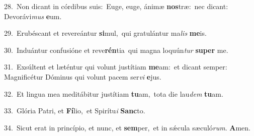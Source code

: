 {\numbfont\textcolor{\numbcolor}{28.}}~Non dicant in córdibus suis:~\dagger Euge, euge, ánimæ \textbf{nos}\-træ:~\star nec dicant: Devorávi\textit{mus} \textbf{e}\-um.\par
{\numbfont\textcolor{\numbcolor}{29.}}~Erubéscant et revereántur \textbf{si}\-mul,~\star qui gratulántur ma\textit{lis} \textbf{me}\-is.\par
{\numbfont\textcolor{\numbcolor}{30.}}~Induántur confusióne et reve\-\textbf{rén}\-tia~\star qui magna loquún\textit{tur} \textbf{su}\-\textbf{per} me.\par
{\numbfont\textcolor{\numbcolor}{31.}}~Exsúltent et læténtur qui volunt justítiam \textbf{me}\-am:~\star et dicant semper: Magnificétur Dóminus qui volunt pacem ser\textit{vi} \textbf{e}\-jus.\par
{\numbfont\textcolor{\numbcolor}{32.}}~Et lingua mea meditábitur justítiam \textbf{tu}\-am,~\star tota die lau\textit{dem} \textbf{tu}\-am.\par
{\numbfont\textcolor{\numbcolor}{33.}}~Glória Patri, et \textbf{Fí}\-lio,~\star et Spirítu\textit{i} \textbf{Sanc}\-to.\par
{\numbfont\textcolor{\numbcolor}{34.}}~Sicut erat in princípio, et nunc, et \textbf{sem}\-per,~\star et in sǽcula sæculó\-\textit{rum}\-. \textbf{A}\-men.\par
